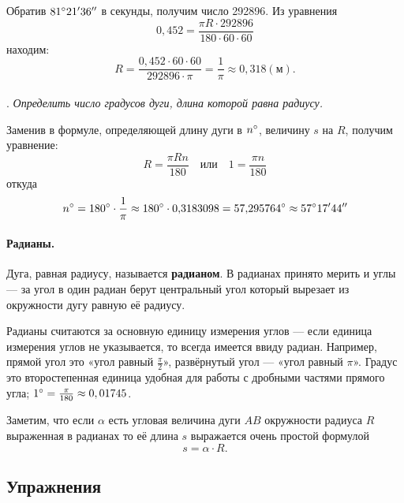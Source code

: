 \documentclass[twoside]{book}
\makeatletter
\newcommand{\rindex}[2][\imki@jobname]{%
  \index[#1]{\detokenize{#2}}%
}
\makeatother
\begin{document}
Обратив $81\degree 21'36''$ в секунды, получим число 292896.
Из уравнения
\[0{,}452 = \frac{\pi R\cdot  292896}{180\cdot 60\cdot 60}\]
находим:
\[R=\frac{0{,}452\cdot 60\cdot 60}{292896\cdot \pi}=\frac1\pi\approx0{,}318 (\text{м}).\]

\paragraph{}\label{1938/241}
.
\emph{Определить число градусов дуги, длина которой равна радиусу.}

Заменив в формуле, определяющей длину дуги в $n\degree$, величину $s$ на $R$, получим уравнение:
\[R=\frac{\pi R n}{180}
\quad\text{или}\quad
1=\frac{\pi n}{180}\]
откуда
\[n\degree = 180\degree \cdot \frac1\pi \approx 180\degree \cdot 0{,}3183098 = 57{,}295764\degree \approx 57\degree17'44''\]

\paragraph{Радианы.}\label{extra/radians}
Дуга, равная радиусу, называется \rindex{радиан}\textbf{радианом}.
В радианах принято мерить и углы — за угол в один радиан берут центральный угол который вырезает из окружности дугу равную её радиусу.

Радианы считаются за основную единицу измерения углов --- если единица измерения углов не указывается, то всегда имеется ввиду радиан.
Например, прямой угол это «угол равный $\tfrac\pi2$», развёрнутый угол --- «угол равный $\pi$».
Градус это второстепенная единица удобная для работы с дробными частями прямого угла;
$1\degree =\tfrac\pi{180}\approx 0{,01745}$.

Заметим, что если $\alpha$ есть угловая величина дуги $AB$ окружности радиуса $R$ выраженная в радианах то её длина  $s$ выражается очень простой формулой
\[s=\alpha\cdot R.\]

\subsection*{Упражнения}
\end{document}
